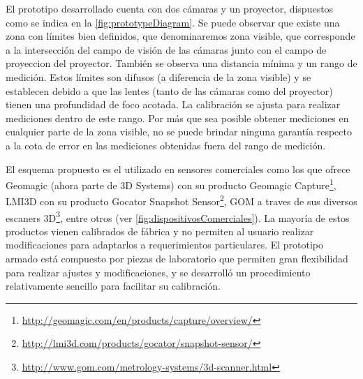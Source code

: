 El prototipo desarrollado cuenta con dos cámaras y un proyector, dispuestos como se indica en la \autoref{fig:prototypeDiagram}.
Se puede observar que existe una zona con límites bien definidos, que denominaremos zona visible, que corresponde a la intersección del campo de visión de las cámaras junto con el campo de proyeccion del proyector. También se observa una distancia mínima y un rango de medición. Estos límites son difusos (a diferencia de la zona visible) y se establecen debido a que las lentes (tanto de las cámaras como del proyector) tienen una profundidad de foco acotada. La calibración se ajusta para realizar mediciones dentro de este rango. Por más que sea posible obtener mediciones en cualquier parte de la zona visible, no se puede brindar ninguna garantía respecto a la cota de error en las mediciones obtenidas fuera del rango de medición.

El esquema propuesto es el utilizado en sensores comerciales como los que ofrece Geomagic (ahora parte de 3D Systems) con su producto Geomagic Capture\footnote{\url{http://geomagic.com/en/products/capture/overview/}}, LMI3D con su producto Gocator Snapshot Sensor\footnote{\url{http://lmi3d.com/products/gocator/snapshot-sensor/}}, GOM a traves de sus diversos escaners 3D\footnote{\url{http://www.gom.com/metrology-systems/3d-scanner.html}}, entre otros (ver \autoref{fig:dispositivosComerciales}).
La mayoría de estos productos vienen calibrados de fábrica y no permiten al usuario realizar modificaciones para adaptarlos a requerimientos particulares. El prototipo armado está compuesto por piezas de laboratorio que permiten gran flexibilidad para realizar ajustes y modificaciones, y se desarrolló un procedimiento relativamente sencillo para facilitar su calibración.

